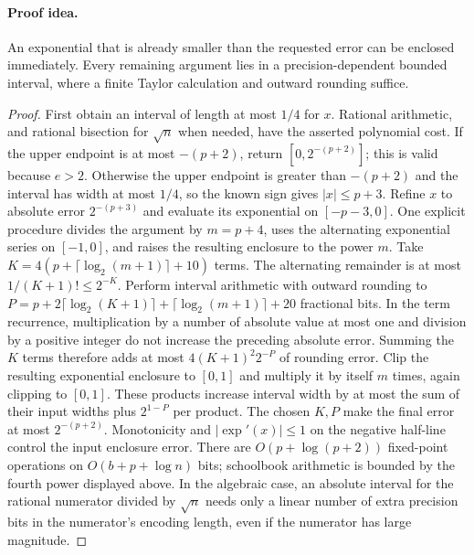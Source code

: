 \paragraph{Proof idea.}
An exponential that is already smaller than the requested error can be enclosed immediately.  Every remaining argument lies in a precision-dependent bounded interval, where a finite Taylor calculation and outward rounding suffice.

\begin{proof}
First obtain an interval of length at most $1/4$ for $x$.
Rational arithmetic, and rational bisection for $\sqrt n$ when
needed, have the asserted polynomial cost. If the upper endpoint
is at most $-(p+2)$, return $[0,2^{-(p+2)}]$; this is valid because
$e>2$. Otherwise the upper endpoint is greater than $-(p+2)$ and
the interval has width at most $1/4$, so the known sign gives
$|x|\le p+3$. Refine $x$ to absolute error
$2^{-(p+3)}$ and evaluate its exponential on $[-p-3,0]$.
One explicit procedure divides the argument by
$m=p+4$, uses the alternating exponential series on $[-1,0]$,
and raises the resulting enclosure to the power $m$.
Take $K=4(p+\lceil\log_2(m+1)\rceil+10)$ terms. The alternating
remainder is at most $1/(K+1)!\le2^{-K}$.
Perform interval arithmetic with outward rounding to
$P=p+2\lceil\log_2(K+1)\rceil+\lceil\log_2(m+1)\rceil+20$
fractional bits. In the term recurrence, multiplication by a
number of absolute value at most one and division by a positive
integer do not increase the preceding absolute error. Summing
the $K$ terms therefore adds at most $4(K+1)^2 2^{-P}$ of
rounding error. Clip the resulting exponential enclosure to
$[0,1]$ and multiply it by itself $m$ times, again clipping to
$[0,1]$. These products increase interval width by at most the
sum of their input widths plus $2^{1-P}$ per product.
The chosen $K,P$ make the final error at most $2^{-(p+2)}$.
Monotonicity and $|\exp'(x)|\le1$ on the negative half-line
control the input enclosure error. There are $O(p+\log(p+2))$
fixed-point operations on $O(b+p+\log n)$ bits; schoolbook
arithmetic is bounded by the fourth power displayed above.
In the algebraic case, an absolute interval
for the rational numerator divided by $\sqrt n$ needs only a
linear number of extra precision bits in the numerator's encoding
length, even if the numerator has large magnitude.
\end{proof}

